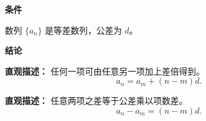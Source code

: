 \begin{statementbox}
	\textbf{\textcolor{CStatement}{条件}}
	\begin{description}[style=nextline, leftmargin=2.8em, labelsep=0.5em, itemsep=0.35em]
		\item[\textbf{\textcolor{CStatement}{条件1（数列定义）：}}] 数列 \(\{a_n\}\) 是等差数列，公差为 \(d\)。
	\end{description}

	\textbf{\textcolor{CStatement}{结论}}
	\begin{description}[style=nextline, leftmargin=2.8em, labelsep=0.5em, itemsep=0.45em]
		\item[\textbf{\textcolor{CStatement}{结论一（任意项公式）：}}]
		      \textbf{\textcolor{CStatement}{直观描述：}}
		      任何一项可由任意另一项加上差倍得到。
		      \[
			      a_n = a_m + (n-m)d .
		      \]

		\item[\textbf{\textcolor{CStatement}{推广结论（差的形式）：}}]
		      \textbf{\textcolor{CStatement}{直观描述：}}
		      任意两项之差等于公差乘以项数差。
		      \[
			      a_n - a_m = (n-m)d .
		      \]
	\end{description}
\end{statementbox}